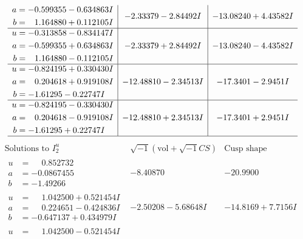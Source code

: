 \documentclass[1p]{elsarticle_modified}
\theoremstyle{definition}
\newcommand{\I}{\sqrt{-1}}
\begin{document}
$$\begin{array}{c|c|c}
\begin{aligned}
a &= -0.599355 - 0.634863 I \\
b &= \phantom{-}1.164880 + 0.112105 I\end{aligned}
 & -2.33379 - 2.84492 I & -13.08240 + 4.43582 I \\ \hline\begin{aligned}
u &= -0.313858 - 0.834147 I \\
a &= -0.599355 + 0.634863 I \\
b &= \phantom{-}1.164880 - 0.112105 I\end{aligned}
 & -2.33379 + 2.84492 I & -13.08240 - 4.43582 I \\ \hline\begin{aligned}
u &= -0.824195 + 0.330430 I \\
a &= \phantom{-}0.204618 + 0.919108 I \\
b &= -1.61295 - 0.22747 I\end{aligned}
 & -12.48810 - 2.34513 I & -17.3401 - 2.9451 I \\ \hline\begin{aligned}
u &= -0.824195 - 0.330430 I \\
a &= \phantom{-}0.204618 - 0.919108 I \\
b &= -1.61295 + 0.22747 I\end{aligned}
 & -12.48810 + 2.34513 I & -17.3401 + 2.9451 I\\
 \hline 
 \end{array}$$\newpage$$\begin{array}{c|c|c}  
\text{Solutions to }I^u_{2}& \I (\text{vol} + \sqrt{-1}CS) & \text{Cusp shape}\\
 \hline 
\begin{aligned}
u &= \phantom{-}0.852732\phantom{ +0.000000I} \\
a &= -0.0867455\phantom{ +0.000000I} \\
b &= -1.49266\phantom{ +0.000000I}\end{aligned}
 & -8.40870\phantom{ +0.000000I} & -20.9900\phantom{ +0.000000I} \\ \hline\begin{aligned}
u &= \phantom{-}1.042500 + 0.521454 I \\
a &= \phantom{-}0.224651 - 0.424836 I \\
b &= -0.647137 + 0.434979 I\end{aligned}
 & -2.50208 - 5.68648 I & -14.8169 + 7.7156 I \\ \hline\begin{aligned}
u &= \phantom{-}1.042500 - 0.521454 I \\

\end{aligned}
\end{array}$$
\end{document}
